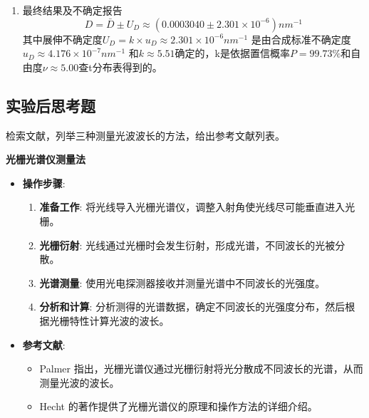 \documentclass[dvipsnames, svgnames,a4paper,11pt]{article}
\begin{document}
\begin{enumerate}
		这里取蓝绿黄各$\pm1$级谱线进行不确定度分析。除此之外，为了方便计算以$nm^{-1}$为单位。
		
		A类评定：按\cref{tab:tab6}取各测量值的实验标准差$u_A=\sigma_{\bar{D}}=\sqrt{\frac{\Sigma D}{n(n-1)}}=3.877\times10^{-7}nm^{-1}$。
		
		B类评定：取前面计算得到的光栅常数d的合成不确定作为D的B类不确定度。
		
		由此计算的到合成不确定度$u_D=\sqrt{u_A^2+\frac{u_B^2}{\bar{d}^4}}\approx 4.176\times10^{-7}nm^{-1}$
		
		\item 最终结果及不确定报告
		\begin{equation*}
			D=\bar{D}\pm U_{D}\approx( 0.0003040\pm  2.301\times10^{-6} )nm^{-1}
		\end{equation*} 
		其中展伸不确定度$U_{D}={k}\times{u_{D}}\approx 2.301\times10^{-6}nm^{-1} $ 是由合成标准不确定度$u_{D}\approx 4.176\times10^{-7}nm^{-1} $ 和$k\approx5.51$确定的，k是依据置信概率$P=99.73\%$和自由度$\nu\approx5.00$查t分布表得到的。
	\end{enumerate}
	
	\clearpage
	\subsection{实验后思考题}
	\begin{question}
		检索文献，列举三种测量光波波长的方法，给出参考文献列表。
	\end{question}
		\textbf{\large 光栅光谱仪测量法}
		\begin{itemize}
			\item \textbf{操作步骤}:
			\begin{enumerate}
				\item \textbf{准备工作}: 将光线导入光栅光谱仪，调整入射角使光线尽可能垂直进入光栅。
				\item \textbf{光栅衍射}: 光线通过光栅时会发生衍射，形成光谱，不同波长的光被分散。
				\item \textbf{光谱测量}: 使用光电探测器接收并测量光谱中不同波长的光强度。
				\item \textbf{分析和计算}: 分析测得的光谱数据，确定不同波长的光强度分布，然后根据光栅特性计算光波的波长。
			\end{enumerate}
			\item \textbf{参考文献}:
			\begin{itemize}
				\item Palmer 指出，光栅光谱仪通过光栅衍射将光分散成不同波长的光谱，从而测量光波的波长。
				\item Hecht 的著作提供了光栅光谱仪的原理和操作方法的详细介绍。
			\end{itemize}
		\end{itemize}
		
\end{document}
